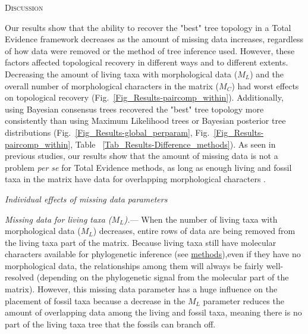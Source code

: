 \documentclass[12pt,letterpaper]{article}
\renewcommand{\section}[1]{%
\bigskip
\begin{center}
\begin{Large}
\normalfont\scshape #1
\medskip
\end{Large}
\end{center}}
\renewcommand{\subsection}[1]{%
\bigskip
\begin{center}
\begin{large}
\normalfont\itshape #1
\end{large}
\end{center}}
\renewcommand{\subsubsection}[1]{%
\vspace{2ex}
\noindent
\textit{#1.}---}
\begin{document}
%
%

\section{Discussion}

Our results show that the ability to recover the "best" tree topology in a Total Evidence framework decreases as the amount of missing data increases, regardless of how data were removed or the method of tree inference used. However, these factors affected topological recovery in different ways and to different extents. Decreasing the amount of living taxa with morphological data ($M_{L}$) and the overall number of morphological characters in the matrix ($M_{C}$) had worst effects on topological recovery (Fig.~\ref{Fig_Results-paircomp_within}). Additionally, using Bayesian consensus trees recovered the "best" tree topology more consistently than using Maximum Likelihood trees or Bayesian posterior tree distributions (Fig.~\ref{Fig_Results-global_perparam}, Fig.~\ref{Fig_Results-paircomp_within}, Table ~\ref{Tab_Results-Difference_methods}). As seen in previous studies, our results show that the amount of missing data is not a problem \textit{per se} for Total Evidence methods, as long as enough living and fossil taxa in the matrix have data for overlapping morphological characters \citep[e.g.][]{kearneyfragmentary2002,wiensmissing2003,rouresite-specific2011,pattinsonphylogeny2014}. 

\subsection{Individual effects of missing data parameters}
\subsubsection{Missing data for living taxa ($M_{L}$)}
When the number of living taxa with morphological data ($M_{L}$) decreases, entire rows of data are being removed from the living taxa part of the matrix. Because living taxa still have molecular characters available for phylogenetic inference (see \hyperref[Generating_the_matrix]{methods}),even if they have no morphological data, the relationships among them will always be fairly well-resolved (depending on the phylogenetic signal from the molecular part of the matrix). However, this missing data parameter has a huge influence on the placement of fossil taxa because a decrease in the $M_{L}$ parameter reduces the amount of overlapping data among the living and fossil taxa, meaning there is no part of the living taxa tree that the fossils can branch off.
\end{document}
